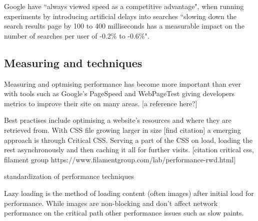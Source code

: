 Google have ``always viewed speed as a competitive advantage", when running experiments by introducing artificial delays into searches ``slowing down the search results page by 100 to 400 milliseconds has a measurable impact on the number of searches per user of -0.2\% to -0.6\%". \cite{speed_matters}

\subsection{Measuring and techniques} \label{l-r--measuring-and-techniques}

Measuring and optmising performance has become more important than ever with tools such as Google's PageSpeed and WebPageTest giving developers metrics to improve their site on many areas. [a reference here?]

Best practises include optimising a website's resources and where they are retrieved from. With CSS file growing larger in size [find citation] a emerging approach is through Critical CSS. Serving a part of the CSS on load, loading the rest asynchronously and then caching it all for further visits. [citation critical css, filament group https://www.filamentgroup.com/lab/performance-rwd.html]




standardization of performance techniques

Lazy loading is the method of loading content (often images) after initial load for performance. While images are non-blocking and don't affect network performance on the critical path other performance issues such as slow paints. %

